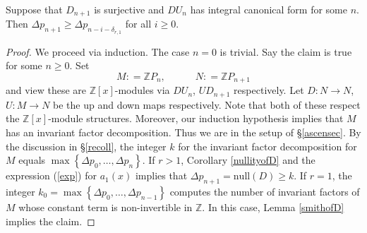 \documentclass[ALCO, Unicode]{cedram}
\newcommand{\ZZ}{\mathbb{Z}}
\begin{document}
\begin{proposition} \label{conjequiv}  Suppose that $ D_{n+1} $ is surjective and  $ DU_{n}  $ has integral canonical form for some $ n $.    Then $\Delta p_{n+1}  \geq \Delta p_{n-i-\delta_{r,1} }  $
for all $ i  \geq  0  $.    
\end{proposition}  


\begin{proof} We proceed via  induction.  
The case $ n = 0 $ is trivial. Say the claim is true for some $ n \geq 0 $.    
Set $$ M :   =  \ZZ P _{n }, \quad   \quad  \quad    N  :    =  \ZZ    P_{n+1} $$ and view these are $  \ZZ  [   x] $-modules via $ DU_{n} $, $ UD_{n+1} $ respectively.  Let  $ D : N \to N $, $ U : M \to N $ be the up and down maps respectively. Note that both of these respect the $\ZZ[x]$-module structures. Moreover, our induction hypothesis implies that $ M $ has an invariant factor decomposition. Thus we are in the setup of \S \ref{ascensec}.  By the discussion in \S \ref{recoll}, the integer $ k $ for the invariant factor decomposition for $ M $ equals  $ \max \left \{ \Delta p_{0}, \ldots, \Delta p_{n}  \right \}  $.   If $ r >  1  $, Corollary \ref{nullityofD} and the expression (\ref{exp}) for $ a_{1}(x) $ implies that $ \Delta p_{n+1} = \mathrm{null}(D)  \geq k $.  If $ r = 1 $, the integer $ k_{0} = \max \left \{ \Delta p_{0}, \ldots, \Delta p_{n-1} \right \} $ computes the number of invariant factors of $ M $ whose constant term is non-invertible in $ \ZZ  $. In this case, Lemma \ref{smithofD} implies the claim. 
 \end{proof} 
 
\end{document}
